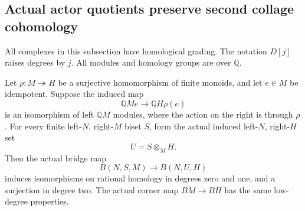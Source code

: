 \subsection{Actual actor quotients preserve second collage cohomology}

All complexes in this subsection have homological grading.  The notation
$D[j]$ raises degrees by $j$.  All modules and homology groups are over
$\mathbb Q$.

\begin{lemma}
\label{CP2:A-idempotent-quotient-bridge-connectivity}
Let $\rho:M\twoheadrightarrow H$ be a surjective homomorphism of finite
monoids, and let $e\in M$ be idempotent.  Suppose the induced map
\[
 \mathbb QM e\longrightarrow\mathbb QH\rho(e)
                                                               \tag{1}
\]
is an isomorphism of left $\mathbb QM$ modules, where the action on the
right is through $\rho$.
For every finite left-$N$, right-$M$ biset $S$, form the actual induced
left-$N$, right-$H$ set
\[
 U=S\otimes_M H.
\]
Then the actual bridge map
\[
 B(N,S,M)\longrightarrow B(N,U,H)
                                                               \tag{2}
\]
induces isomorphisms on rational homology in degrees zero and one,
and a surjection in degree two.
The actual corner map $BM\to BH$ has the same low-degree properties.
\end{lemma}
